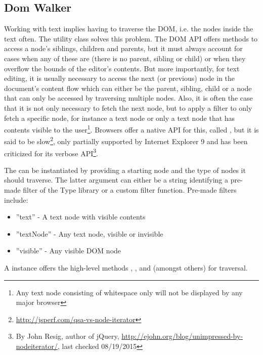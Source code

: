 \subsection{Dom Walker}

Working with text implies having to traverse the DOM, i.e. the nodes inside the text often. The  utility class solves this problem. The DOM API offers methods to access a node's siblings, children and parents, but it must always account for cases when any of these are  (there is no parent, sibling or child) or when they overflow the bounds of the editor's contents. But more importantly, for text editing, it is usually necessary to access the next (or previous) node in the document's content flow which can either be the parent, sibling, child or a node that can only be accessed by traversing multiple nodes. Also, it is often the case that it is not only necessary to fetch the next node, but to apply a filter to only fetch a specific node, for instance a text node or only a text node that has contents visible to the user\footnote{Any text node consisting of whitespace only will not be displayed by any major browser}. Browsers offer a native API for this, called , but it is said to be slow\footnote{\url{http://jsperf.com/qsa-vs-node-iterator}}, only partially supported by Internet Explorer 9 \cite{moznode} and has been criticized for its verbose API\footnote{By John Resig, author of jQuery, \url{http://ejohn.org/blog/unimpressed-by-nodeiterator/}, last checked 08/19/2015}.


The  can be instantiated by providing a starting node and the type of nodes it should traverse. The latter argument can either be a string identifying a pre-made filter of the Type library or a custom filter function. Pre-made filters include:

\begin{itemize}
\item ''text'' - A text node with visible contents
\item ''textNode'' - Any text node, visible or invisible
\item ''visible'' - Any visible DOM node
\end{itemize}

A  instance offers the high-level methods , ,  and  (amongst others) for traversal. %

